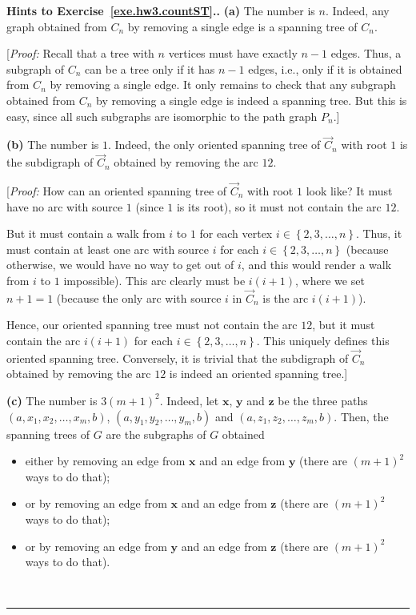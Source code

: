\documentclass[numbers=enddot,12pt,final,onecolumn,notitlepage]{scrartcl}%
\theoremstyle{definition}
\newenvironment{proof}[1][Proof]{\noindent\textbf{#1.} }{\ \rule{0.5em}{0.5em}}
\newcommand{\set}[1]{\left\{ #1 \right\}}
\newcommand{\tup}[1]{\left( #1 \right)}
\begin{document}
\begin{proof}[Hints to Exercise~\ref{exe.hw3.countST}.]
\textbf{(a)} The number is $n$.
Indeed, any graph obtained from $C_n$ by removing a single edge is a
spanning tree of $C_n$.

[\textit{Proof:} Recall that a tree
with $n$ vertices must have exactly $n-1$ edges.
Thus, a subgraph of $C_n$ can be a tree only if it has $n-1$ edges,
i.e., only if it is obtained from $C_n$ by removing a single edge.
It only remains to check that any subgraph obtained from $C_n$ by
removing a single edge is indeed a spanning tree.
But this is easy, since all such subgraphs are isomorphic to the path
graph $P_n$.]

\textbf{(b)} The number is $1$.
Indeed, the only oriented spanning tree of $\overrightarrow{C}_n$ with
root $1$ is the subdigraph of $\overrightarrow{C}_n$ obtained by
removing the arc $12$.

[\textit{Proof:} How can an oriented spanning tree of
$\overrightarrow{C}_n$ with root $1$ look like?
It must have no arc with source $1$ (since $1$ is its root), so it
must not contain the arc $12$.

But it must contain a walk from $i$ to $1$ for each vertex
$i \in \set{2, 3, \ldots, n}$.
Thus, it must contain at least one arc with source $i$ for each
$i \in \set{2, 3, \ldots, n}$ (because otherwise, we would have no way
to get out of $i$, and this would render a walk from $i$ to $1$
impossible).
This arc clearly must be $i \tup{i+1}$, where we set $n+1 = 1$
(because the only arc with source $i$ in $\overrightarrow{C}_n$ is the
arc $i \tup{i+1}$).

Hence, our oriented spanning tree must not contain the arc $12$, but
it must contain the arc $i \tup{i+1}$ for each
$i \in \set{2, 3, \ldots, n}$.
This uniquely defines this oriented spanning tree.
Conversely, it is trivial that the subdigraph of
$\overrightarrow{C}_n$ obtained by removing the arc $12$ is indeed an
oriented spanning tree.]

\textbf{(c)} The number is $3 \tup{m+1}^2$.
Indeed, let $\mathbf{x}$, $\mathbf{y}$ and $\mathbf{z}$ be the three
paths $\tup{a, x_1, x_2, \ldots, x_m, b}$,
$\tup{a, y_1, y_2, \ldots, y_m, b}$ and
$\tup{a, z_1, z_2, \ldots, z_m, b}$.
Then, the spanning trees of $G$ are the subgraphs of $G$ obtained
\begin{itemize}
\item either by removing an edge from $\mathbf{x}$ and an edge from
      $\mathbf{y}$ (there are $\tup{m+1}^2$ ways to do that);
\item or by removing an edge from $\mathbf{x}$ and an edge from
      $\mathbf{z}$ (there are $\tup{m+1}^2$ ways to do that);
\item or by removing an edge from $\mathbf{y}$ and an edge from
      $\mathbf{z}$ (there are $\tup{m+1}^2$ ways to do that).
\end{itemize}


\end{proof}
\end{document}
